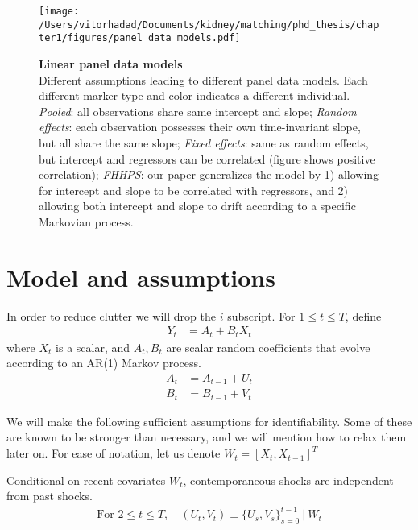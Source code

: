   \begin{figure}
    \texttt{[image: /Users/vitorhadad/Documents/kidney/matching/phd\_thesis/chapter1/figures/panel\_data\_models.pdf]}
    \caption[Linear panel data models]{\textbf{Linear panel data models} \\ Different assumptions leading to different panel data models. Each different marker type and color indicates a different individual. \emph{Pooled}: all observations share same intercept and slope; \emph{Random effects}: each observation possesses their own time-invariant slope, but all share the same slope; \emph{Fixed effects}: same as random effects, but intercept and regressors can be correlated (figure shows positive correlation); \emph{FHHPS}: our paper generalizes the model by 1) allowing for intercept and slope to be correlated with regressors, and 2) allowing both intercept and slope to drift according to a specific Markovian process.}
    \label{fig:panel_data_models}
  \end{figure}


\section{Model and assumptions}

In order to reduce clutter we will drop the $i$ subscript. For $1 \leq t \leq T$, define
\begin{align*}
Y_{t} &= A_{t} + B_{t}X_{t}
\end{align*}
where $X_{t}$ is a scalar, and $A_{t}, B_{t}$ are scalar random coefficients that evolve according to an AR(1) Markov process.
\begin{align}
  A_{t} &= A_{t-1} + U_{t} \\
  B_{t} &= B_{t-1} + V_{t}  
\end{align}

We will make the following sufficient assumptions for identifiability. Some of these are known to be stronger than necessary, and we will mention how to relax them later on. For ease of notation, let us denote $W_t = [X_t, X_{t-1}]^{T}$

\begin{assumption}{} \label{a:timeindependence}
  Conditional on recent covariates $W_t$, contemporaneous shocks are independent from past shocks.
  \begin{align}
    \text{For }2 \leq t \leq T ,
    \quad     
    (U_t, V_t) \perp \{ U_s, V_s \}_{s=0}^{t-1} \  | \ W_t
  \end{align}
\end{assumption}


